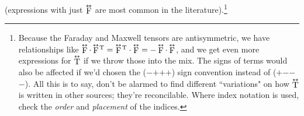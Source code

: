 \documentclass[12pt]{article}
\newcommand{\tightoverset}[2]{%
  \mathop{#2}\limits^{\vbox to -.5ex{\kern-0.75ex\hbox{$#1$}\vss}}}
\newcommand{\inlinedy}[1]{\tightoverset{\text{\tiny$\bm\leftrightarrow$}}{#1}}
\newcommand{\fnoverset}[2]{%
  \mathop{#2}\limits^{\vbox to -.5ex{\kern-0.85ex\hbox{$#1$}\vss}}}
\newcommand{\footnotedy}[1]{\fnoverset{\text{\tiny$\bm\leftrightarrow$}}{#1}}
\begin{document}
(expressions with just $\inlinedy{\mathrm{F}}$ are most common in the literature).\footnote{Because the Faraday and Maxwell tensors are antisymmetric, we have relationships like $\footnotedy{\mathrm{F}} \cdot \footnotedy{\mathrm{F}} \mkern-2mu^\mathrm{T} = \footnotedy{\mathrm{F}} \mkern-2mu^\mathrm{T} \cdot \footnotedy{\mathrm{F}} = - \footnotedy{\mathrm{F}} \cdot \footnotedy{\mathrm{F}}$, and we get even more expressions for $\footnotedy{\mathrm{T}}$ if we throw those into the mix. The signs of terms would also be affected if we'd chosen the ($-$$+$$+$$+$) sign convention instead of ($+$$-$$-$$-$). All this is to say, don't be alarmed to find different ``variations" on how $\footnotedy{\mathrm{T}}$ is written in other sources; they're reconcilable. Where index notation is used, check the \emph{order} and \emph{placement} of the indices.}
\end{document}
